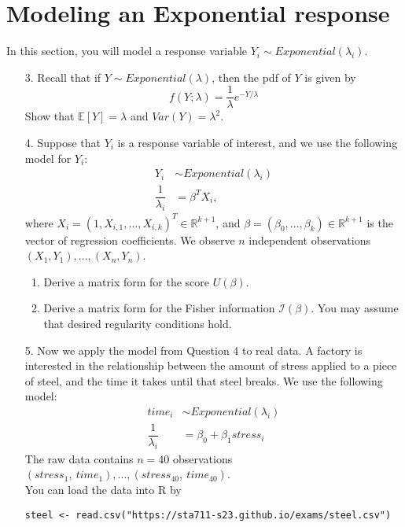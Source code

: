 \documentclass[11pt]{article}
\begin{document}
\newpage

\section*{Modeling an Exponential response}

In this section, you will model a response variable $Y_i \sim Exponential(\lambda_i)$.

\begin{enumerate}
\item[3.] Recall that if $Y \sim Exponential(\lambda)$, then the pdf of $Y$ is given by
$$f(Y;\lambda) = \frac{1}{\lambda} e^{-Y / \lambda}$$
Show that $\mathbb{E}[Y] = \lambda$ and $Var(Y) = \lambda^2$.

\item[4.] Suppose that $Y_i$ is a response variable of interest, and we use the following model for $Y_i$:
\begin{align*}
Y_i &\sim Exponential(\lambda_i) \\
\dfrac{1}{\lambda_i} &= \beta^T X_i,
\end{align*}
where $X_i = (1, X_{i,1},...,X_{i,k})^T \in \mathbb{R}^{k+1}$, and $\beta = (\beta_0, ..., \beta_k) \in \mathbb{R}^{k+1}$ is the vector of regression coefficients. We observe $n$ independent observations $(X_1, Y_1),...,(X_n, Y_n)$.

\begin{enumerate}
\item Derive a matrix form for the score $U(\beta)$.
\item Derive a matrix form for the Fisher information $\mathcal{I}(\beta)$. You may assume that desired regularity conditions hold.
\end{enumerate}

\item[5.] Now we apply the model from Question 4 to real data. A factory is interested in the relationship between the amount of stress applied to a piece of steel, and the time it takes until that steel breaks. We use the following model:
\begin{align*}
time_i &\sim Exponential(\lambda_i) \\
\dfrac{1}{\lambda_i} &= \beta_0 + \beta_1 stress_i
\end{align*}
The raw data contains $n = 40$ observations $(stress_1, \ time_1),...,(stress_{40}, \ time_{40})$.\\

\noindent You can load the data into R by
\begin{verbatim}
steel <- read.csv("https://sta711-s23.github.io/exams/steel.csv")
\end{verbatim}


\end{enumerate}
\end{document}
